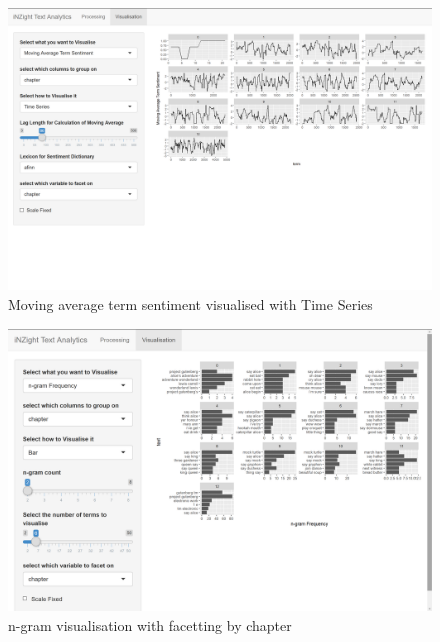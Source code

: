 \documentclass[11pt, a4paper, oneside]{report}
\begin{document}
\begin{figure}
\centering
\includegraphics[scale=0.4]{visualisation-ma-overview.png}
\caption{Moving average term sentiment visualised with Time Series\label{fig:visualisation-ma-overview}}
\end{figure}

\begin{figure}
\centering
\includegraphics[scale=0.4]{visualisation-n-gram-facet.png}
\caption{n-gram visualisation with facetting by chapter\label{fig:visualisation-n-gram-facet}}
\end{figure}
\end{document}

